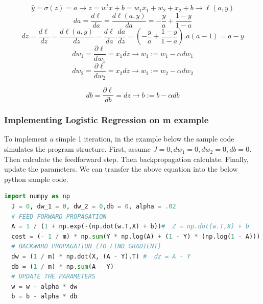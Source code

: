 \begin{equation}\label{eq:logistic_regression_derivatives_single_example}
  \boxed{\widehat{y} = \sigma(z) = a} \longrightarrow \boxed{ z = w^tx + b = w_1x_1+ w_2+x_2+ b} \longrightarrow \boxed{\ell(a,y)}
 \end{equation}
 \begin{equation}\label{eq:logistic_regression_derivatives_da}
   \boxed{da = \frac{d\ell}{da} = \frac{d\ell(a,y)}{da} = - \frac{y}{a} + \frac{1-y}{1-a}}
 \end{equation}
  \begin{equation}\label{eq:logistic_regression_derivatives_dz}
  \boxed{dz = \frac{d\ell}{dz} = \frac{d\ell(a,y)}{dz} = \frac{d\ell}{da} . \frac{da}{dz}} = \boxed{(- \frac{y}{a} + \frac{1-y}{1-a}) . a(a-1) } = \boxed{ a - y  }
 \end{equation}
 \begin{equation}\label{eq:logistic_regression_derivatives_dw1}
   \boxed{dw_1 = \frac{\partial\ell}{dw_1} = x_1 dz} \longrightarrow \boxed{ w_1 := w_1 - \alpha dw_1}
 \end{equation}
  \begin{equation}\label{eq:logistic_regression_derivatives_dw2}
  \boxed{dw_2 = \frac{\partial\ell}{dw_2} = x_2 dz} \longrightarrow \boxed{ w_2 := w_2 - \alpha dw_2}
 \end{equation}


 \begin{equation}\label{eq:logistic_regression_derivatives_db}
  \boxed{db = \frac{\partial\ell}{db} = dz} \longrightarrow \boxed{ b := b - \alpha db}
\end{equation}
 \subsubsection{Implementing Logistic Regression on m example}

To implement a simple 1 iteration, in the example below the sample code simulates the program structure. First, assume $J = 0, dw_1 = 0, dw_2 = 0,db = 0$. Then calculate the feedforward step. Then backpropagation calculate. Finally, update the parameters. We can transfer the above equation into the below python sample code.%

 \begin{lstlisting}[language=Python]
  import numpy as np
  J = 0, dw_1 = 0, dw_2 = 0,db = 0, alpha = .02
  # FEED FORWARD PROPAGATION
  A = 1 / (1 + np.exp(-(np.dot(w.T,X) + b))#  Z = np.dot(w.T,X) + b
  cost = (- 1 / m) * np.sum(Y * np.log(A) + (1 - Y) * (np.log(1 - A)))
  # BACKWARD PROPAGATION (TO FIND GRADIENT)
  dw = (1 / m) * np.dot(X, (A - Y).T) #  dz = A - Y
  db = (1 / m) * np.sum(A - Y)
  # UPDATE THE PARAMETERS
  w = w - alpha * dw
  b = b - alpha * db
 \end{lstlisting}%

